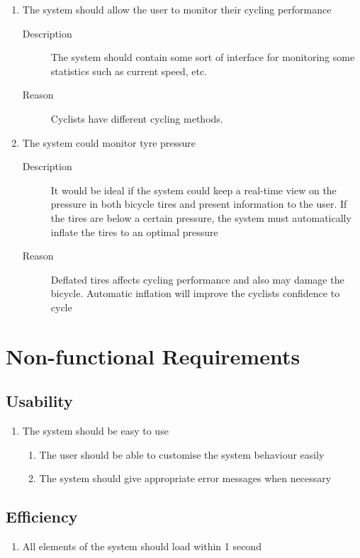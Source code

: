 \documentclass[a4paper]{report}
\begin{document}
\begin{enumerate}[label=\ref*{sec:func_req}.\arabic*.,leftmargin=*]
\item The system should allow the user to monitor their cycling performance
\begin{description}
\item[Description] The system should contain some sort of interface for monitoring some statistics such as current speed, etc.
\item[Reason] Cyclists have different cycling methods.
\end{description}

\item The system could monitor tyre pressure
\begin{description}
\item[Description] It would be ideal if the system could keep a real-time view on the pressure in both bicycle tires and present information to the user. If the tires are below a certain pressure, the system must automatically inflate the tires to an optimal pressure
\item[Reason] Deflated tires affects cycling performance and also may damage the bicycle. Automatic inflation will improve the cyclists confidence to cycle
\end{description}
\end{enumerate}

\section{Non-functional Requirements}
\subsection{Usability}
\label{usability}
\begin{enumerate}[label=\ref*{usability}.\arabic*.,leftmargin=*]
\item The system should be easy to use
\begin{enumerate}[label*=\arabic*.]
\item The user should be able to customise the system behaviour easily
\item The system should give appropriate error messages when necessary
\end{enumerate}
\end{enumerate}
\subsection{Efficiency}
\label{efficiency}
\begin{enumerate}[label=\ref*{efficiency}.\arabic*.,leftmargin=*]
\item All elements of the system should load within 1 second
\end{enumerate}
\end{document}

